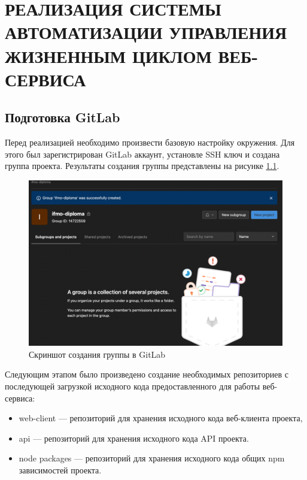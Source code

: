 \chapter{РЕАЛИЗАЦИЯ СИСТЕМЫ АВТОМАТИЗАЦИИ УПРАВЛЕНИЯ ЖИЗНЕННЫМ ЦИКЛОМ ВЕБ-СЕРВИСА}
\label{cha:impl}

\section{Подготовка GitLab}

Перед реализацией необходимо произвести базовую настройку окружения.
Для этого был зарегистрирован GitLab аккаунт, установле SSH ключ и создана группа проекта.
Результаты создания группы представлены на рисунке \ref{fig:group-ready}.

\begin{figure}[ht]
    \centering
    \includegraphics[scale=0.4]{figures/0}
    \caption{Скриншот создания группы в GitLab}
    \label{fig:group-ready}
\end{figure}

Следующим этапом было произведено создание необходимых репозиториев с последующей загрузкой исходного кода предоставленного для работы веб-сервиса:

\begin{itemize}
    \item web-client --- репозиторий для хранения исходного кода веб-клиента проекта,
    \item api --- репозиторий для хранения исходного кода API проекта.
    \item node packages --- репозиторий для хранения исходного кода общих npm зависимостей проекта.
\end{itemize}

